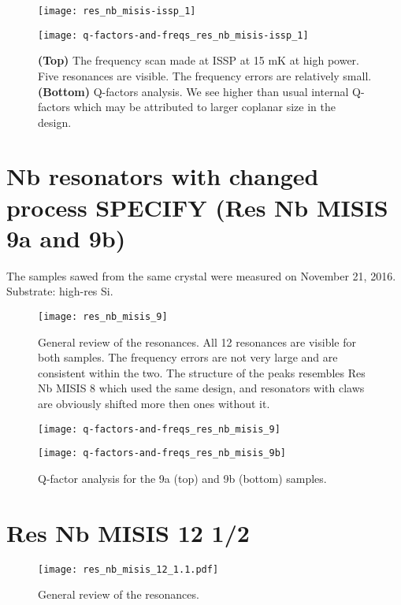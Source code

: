 \documentclass[12pt]{article}
\numberwithin{equation}{section}
\numberwithin{figure}{section}
\begin{document}
\begin{figure}[h!]
\centering
\texttt{[image: res\_nb\_misis-issp\_1]}

\vspace{0.5cm}
\texttt{[image: q-factors-and-freqs\_res\_nb\_misis-issp\_1]}

\caption{\textbf{(Top)} The frequency scan made at ISSP at 15 mK at high power. Five resonances are visible. The frequency errors are relatively small. \textbf{(Bottom)} Q-factors analysis. We see higher than usual internal Q-factors which may be attributed to larger coplanar size in the design.}
\label{fig:res_nb_misis_5_general}
\end{figure}

\section{Nb resonators with changed process SPECIFY (Res Nb MISIS 9a and 9b)}

The samples sawed from the same crystal were measured on November 21, 2016. Substrate: high-res Si.

\begin{figure}[h!]
\centering
\texttt{[image: res\_nb\_misis\_9]}

\caption{ General review of the resonances. All 12 resonances are visible for both samples. The frequency errors are not very large and are consistent within the two. The structure of the peaks resembles Res Nb MISIS 8 which used the same design, and resonators with claws are obviously shifted more then ones without it.}
\end{figure}

\begin{figure}[h!]
\centering
\texttt{[image: q-factors-and-freqs\_res\_nb\_misis\_9]}

\vspace{0.5cm}
\texttt{[image: q-factors-and-freqs\_res\_nb\_misis\_9b]}

\caption{Q-factor analysis for the 9a (top) and 9b (bottom) samples.}
\end{figure}


\section{Res Nb MISIS 12 1/2}

\begin{figure}[h!]
\centering
\texttt{[image: res\_nb\_misis\_12\_1.1.pdf]}

\caption{ General review of the resonances.}
\end{figure}
\end{document}
